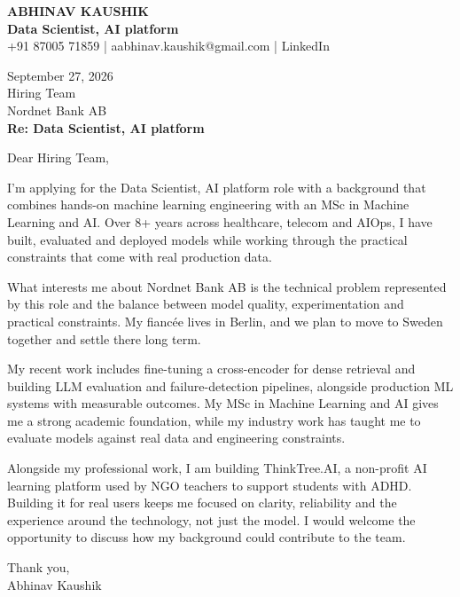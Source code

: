 \documentclass[10pt,a4paper]{article}
\begin{document}
\begin{center}
{\Large\bfseries ABHINAV KAUSHIK}\\[2pt]
{\bfseries Data Scientist, AI platform}\\[2pt]
+91 87005 71859 \quad | \quad aabhinav.kaushik@gmail.com \quad | \quad LinkedIn
\end{center}
\vspace{8pt}
September 27, 2026\\[6pt]
Hiring Team\\
Nordnet Bank AB\\[4pt]
\textbf{Re: Data Scientist, AI platform}

Dear Hiring Team,

I’m applying for the Data Scientist, AI platform role with a background that combines hands-on machine learning engineering with an MSc in Machine Learning and AI. Over 8+ years across healthcare, telecom and AIOps, I have built, evaluated and deployed models while working through the practical constraints that come with real production data.

What interests me about Nordnet Bank AB is the technical problem represented by this role and the balance between model quality, experimentation and practical constraints. My fiancée lives in Berlin, and we plan to move to Sweden together and settle there long term.

My recent work includes fine-tuning a cross-encoder for dense retrieval and building LLM evaluation and failure-detection pipelines, alongside production ML systems with measurable outcomes. My MSc in Machine Learning and AI gives me a strong academic foundation, while my industry work has taught me to evaluate models against real data and engineering constraints.

Alongside my professional work, I am building ThinkTree.AI, a non-profit AI learning platform used by NGO teachers to support students with ADHD. Building it for real users keeps me focused on clarity, reliability and the experience around the technology, not just the model. I would welcome the opportunity to discuss how my background could contribute to the team.

Thank you,\\
Abhinav Kaushik
\end{document}
